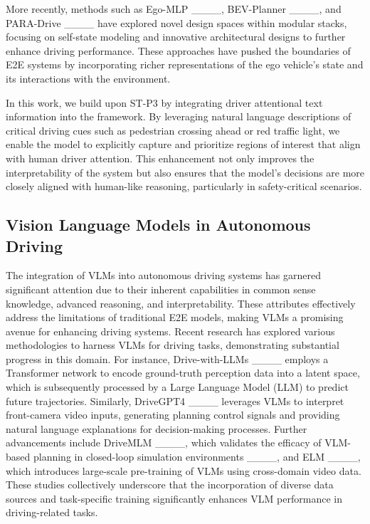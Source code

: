 More recently, methods such as Ego-MLP ____, BEV-Planner ____, and PARA-Drive ____ have explored novel design spaces within modular stacks, focusing on self-state modeling and innovative architectural designs to further enhance driving performance. These approaches have pushed the boundaries of E2E systems by incorporating richer representations of the ego vehicle’s state and its interactions with the environment.

In this work, we build upon ST-P3 by integrating driver attentional text information into the framework. By leveraging natural language descriptions of critical driving cues such as pedestrian crossing ahead or red traffic light, we enable the model to explicitly capture and prioritize regions of interest that align with human driver attention. This enhancement not only improves the interpretability of the system but also ensures that the model’s decisions are more closely aligned with human-like reasoning, particularly in safety-critical scenarios.

\subsection{Vision Language Models in Autonomous Driving}
The integration of VLMs into autonomous driving systems has garnered significant attention due to their inherent capabilities in common sense knowledge, advanced reasoning, and interpretability. These attributes effectively address the limitations of traditional E2E models, making VLMs a promising avenue for enhancing driving systems. Recent research has explored various methodologies to harness VLMs for driving tasks, demonstrating substantial progress in this domain.
For instance, Drive-with-LLMs ____ employs a Transformer network to encode ground-truth perception data into a latent space, which is subsequently processed by a Large Language Model (LLM) to predict future trajectories. Similarly, DriveGPT4 ____ leverages VLMs to interpret front-camera video inputs, generating planning control signals and providing natural language explanations for decision-making processes. Further advancements include DriveMLM ____, which validates the efficacy of VLM-based planning in closed-loop simulation environments ____, and ELM ____, which introduces large-scale pre-training of VLMs using cross-domain video data. These studies collectively underscore that the incorporation of diverse data sources and task-specific training significantly enhances VLM performance in driving-related tasks.

